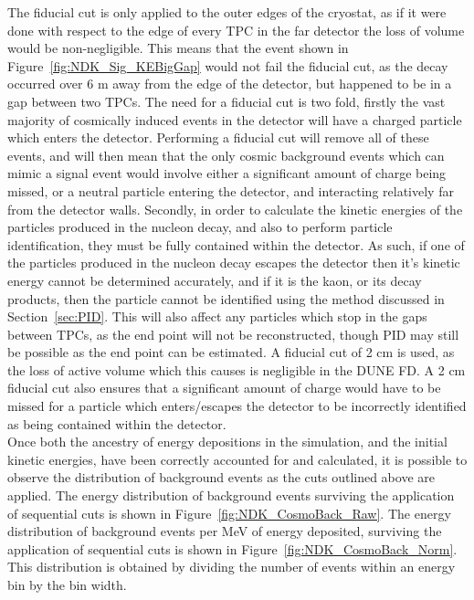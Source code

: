 The fiducial cut is only applied to the outer edges of the cryostat, as if it were done with respect to the edge of every TPC in the far detector the loss of volume would be non-negligible. This means that the event shown in Figure~\ref{fig:NDK_Sig_KEBigGap} would not fail the fiducial cut, as the decay occurred over 6 m away from the edge of the detector, but happened to be in a gap between two TPCs. The need for a fiducial cut is two fold, firstly the vast majority of cosmically induced events in the detector will have a charged particle which enters the detector. Performing a fiducial cut will remove all of these events, and will then mean that the only cosmic background events which can mimic a signal event would involve either a significant amount of charge being missed, or a neutral particle entering the detector, and interacting relatively far from the detector walls. Secondly, in order to calculate the kinetic energies of the particles produced in the nucleon decay, and also to perform particle identification, they must be fully contained within the detector. As such, if one of the particles produced in the nucleon decay escapes the detector then it's kinetic energy cannot be determined accurately, and if it is the kaon, or its decay products, then the particle cannot be identified using the method discussed in Section~\ref{sec:PID}. This will also affect any particles which stop in the gaps between TPCs, as the end point will not be reconstructed, though PID may still be possible as the end point can be estimated. A fiducial cut of 2 cm is used, as the loss of active volume which this causes is negligible in the DUNE FD. A 2 cm fiducial cut also ensures that a significant amount of charge would have to be missed for a particle which enters/escapes the detector to be incorrectly identified as being contained within the detector. \\

Once both the ancestry of energy depositions in the simulation, and the initial kinetic energies, have been correctly accounted for and calculated, it is possible to observe the distribution of background events as the cuts outlined above are applied. The energy distribution of background events surviving the application of sequential cuts is shown in Figure~\ref{fig:NDK_CosmoBack_Raw}. The energy distribution of background events per MeV of energy deposited, surviving the application of sequential cuts is shown in Figure~\ref{fig:NDK_CosmoBack_Norm}. This distribution is obtained by dividing the number of events within an energy bin by the bin width. \\


